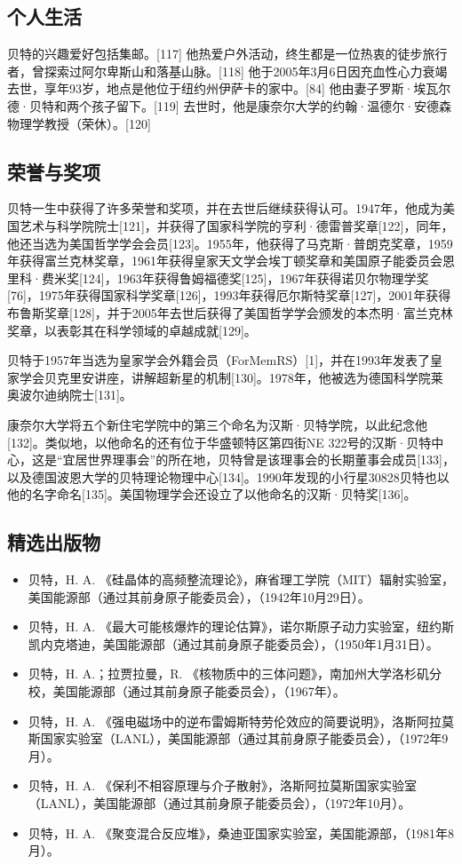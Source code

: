 \subsection{个人生活}
贝特的兴趣爱好包括集邮。[117] 他热爱户外活动，终生都是一位热衷的徒步旅行者，曾探索过阿尔卑斯山和落基山脉。[118] 他于2005年3月6日因充血性心力衰竭去世，享年93岁，地点是他位于纽约州伊萨卡的家中。[84] 他由妻子罗斯·埃瓦尔德·贝特和两个孩子留下。[119] 去世时，他是康奈尔大学的约翰·温德尔·安德森物理学教授（荣休）。[120]
\subsection{荣誉与奖项}  
贝特一生中获得了许多荣誉和奖项，并在去世后继续获得认可。1947年，他成为美国艺术与科学院院士[121]，并获得了国家科学院的亨利·德雷普奖章[122]，同年，他还当选为美国哲学学会会员[123]。1955年，他获得了马克斯·普朗克奖章，1959年获得富兰克林奖章，1961年获得皇家天文学会埃丁顿奖章和美国原子能委员会恩里科·费米奖[124]，1963年获得鲁姆福德奖[125]，1967年获得诺贝尔物理学奖[76]，1975年获得国家科学奖章[126]，1993年获得厄尔斯特奖章[127]，2001年获得布鲁斯奖章[128]，并于2005年去世后获得了美国哲学学会颁发的本杰明·富兰克林奖章，以表彰其在科学领域的卓越成就[129]。

贝特于1957年当选为皇家学会外籍会员（ForMemRS）[1]，并在1993年发表了皇家学会贝克里安讲座，讲解超新星的机制[130]。1978年，他被选为德国科学院莱奥波尔迪纳院士[131]。

康奈尔大学将五个新住宅学院中的第三个命名为汉斯·贝特学院，以此纪念他[132]。类似地，以他命名的还有位于华盛顿特区第四街NE 322号的汉斯·贝特中心，这是“宜居世界理事会”的所在地，贝特曾是该理事会的长期董事会成员[133]，以及德国波恩大学的贝特理论物理中心[134]。1990年发现的小行星30828贝特也以他的名字命名[135]。美国物理学会还设立了以他命名的汉斯·贝特奖[136]。
\subsection{精选出版物}  
\begin{itemize}
\item 贝特，H. A. 《硅晶体的高频整流理论》，麻省理工学院（MIT）辐射实验室，美国能源部（通过其前身原子能委员会），（1942年10月29日）。  
\item 贝特，H. A. 《最大可能核爆炸的理论估算》，诺尔斯原子动力实验室，纽约斯凯内克塔迪，美国能源部（通过其前身原子能委员会），（1950年1月31日）。  
\item 贝特，H. A.；拉贾拉曼，R. 《核物质中的三体问题》，南加州大学洛杉矶分校，美国能源部（通过其前身原子能委员会），（1967年）。  
\item 贝特，H. A. 《强电磁场中的逆布雷姆斯特劳伦效应的简要说明》，洛斯阿拉莫斯国家实验室（LANL），美国能源部（通过其前身原子能委员会），（1972年9月）。  
\item 贝特，H. A. 《保利不相容原理与介子散射》，洛斯阿拉莫斯国家实验室（LANL），美国能源部（通过其前身原子能委员会），（1972年10月）。  
\item 贝特，H. A. 《聚变混合反应堆》，桑迪亚国家实验室，美国能源部，（1981年8月）。
\end{itemize}
